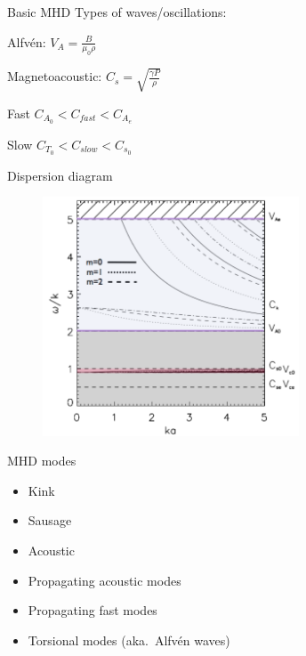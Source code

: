 \documentclass[table]{beamer}
\begin{document}
\begin{frame}{Basic MHD}
    Types of waves/oscillations:
    \begin{itemize*}
        \item Alfv\'en: $V_A = \frac{B}{\mu_0\rho}$
        \item Magnetoacoustic: $C_s = \sqrt{\frac{\gamma P}{\rho}}$
            \begin{itemize*}
                \item Fast $C_{A_0} < C_{fast} < C_{A_e} $
                \item Slow $C_{T_0} < C_{slow} < C_{s_0} $
            \end{itemize*}
    \end{itemize*}
\end{frame}%

\begin{frame}{Dispersion diagram}
    \begin{figure}
        \includegraphics[width=3in]{disp_diagram.png}
    \end{figure}
\end{frame}%

\begin{frame}{MHD modes}
    \begin{itemize}
        \item Kink
        \item Sausage
        \item Acoustic
        \item Propagating acoustic modes
        \item Propagating fast modes
        \item Torsional modes (aka.\ Alfv\'en waves)
    \end{itemize}
\end{frame}%
\end{document}
